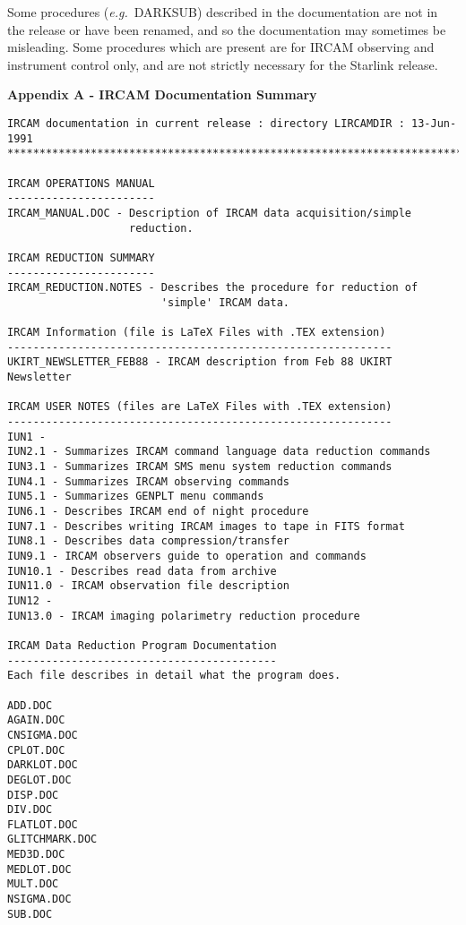 Some procedures ({\it e.g.}\ DARKSUB) described in the documentation are
not in the release or have been renamed, and so the documentation may
sometimes be misleading. Some procedures which are present are for IRCAM
observing and instrument control only, and are not strictly necessary
for the Starlink release. 
\newpage
\vspace{-20mm}
\begin{center}
\large{\bf Appendix A - IRCAM Documentation Summary}
\end{center}
\small
\begin{verbatim}
IRCAM documentation in current release : directory LIRCAMDIR : 13-Jun-1991
**************************************************************************

IRCAM OPERATIONS MANUAL
-----------------------
IRCAM_MANUAL.DOC - Description of IRCAM data acquisition/simple 
                   reduction.

IRCAM REDUCTION SUMMARY
-----------------------
IRCAM_REDUCTION.NOTES - Describes the procedure for reduction of
                        'simple' IRCAM data.

IRCAM Information (file is LaTeX Files with .TEX extension)
------------------------------------------------------------
UKIRT_NEWSLETTER_FEB88 - IRCAM description from Feb 88 UKIRT Newsletter 

IRCAM USER NOTES (files are LaTeX Files with .TEX extension)
------------------------------------------------------------
IUN1 - 
IUN2.1 - Summarizes IRCAM command language data reduction commands
IUN3.1 - Summarizes IRCAM SMS menu system reduction commands 
IUN4.1 - Summarizes IRCAM observing commands
IUN5.1 - Summarizes GENPLT menu commands
IUN6.1 - Describes IRCAM end of night procedure
IUN7.1 - Describes writing IRCAM images to tape in FITS format
IUN8.1 - Describes data compression/transfer
IUN9.1 - IRCAM observers guide to operation and commands
IUN10.1 - Describes read data from archive
IUN11.0 - IRCAM observation file description
IUN12 -
IUN13.0 - IRCAM imaging polarimetry reduction procedure

IRCAM Data Reduction Program Documentation
------------------------------------------
Each file describes in detail what the program does.

ADD.DOC
AGAIN.DOC
CNSIGMA.DOC
CPLOT.DOC
DARKLOT.DOC
DEGLOT.DOC
DISP.DOC
DIV.DOC
FLATLOT.DOC
GLITCHMARK.DOC
MED3D.DOC
MEDLOT.DOC
MULT.DOC
NSIGMA.DOC
SUB.DOC
\end{verbatim}
\normalsize

